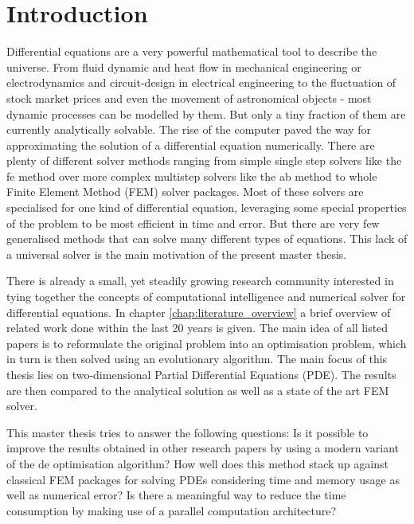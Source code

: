 \documentclass[./\jobname.tex]{subfiles}
\begin{document}
\chapter{Introduction}

Differential equations are a very powerful mathematical tool to describe the universe. From fluid dynamic and heat flow in mechanical engineering or electrodynamics and circuit-design in electrical engineering to the fluctuation of stock market prices and even the movement of astronomical objects - most dynamic processes can be modelled by them. But only a tiny fraction of them are currently analytically solvable. The rise of the computer paved the way for approximating the solution of a differential equation numerically. There are plenty of different solver methods ranging from simple single step solvers like the \gls{fe} method over more complex multistep solvers like the \gls{ab} method to whole Finite Element Method (FEM) solver packages. Most of these solvers are specialised for one kind of differential equation, leveraging some special properties of the problem to be most efficient in time and error. But there are very few generalised methods that can solve many different types of equations. This lack of a universal solver is the main motivation of the present master thesis.

There is already a small, yet steadily growing research community interested in tying together the concepts of computational intelligence and numerical solver for differential equations. In chapter \ref{chap:literature_overview} a brief overview of related work done within the last 20 years is given. The main idea of all listed papers is to reformulate the original problem into an optimisation problem, which in turn is then solved using an evolutionary algorithm. The main focus of this thesis lies on two-dimensional Partial Differential Equations (PDE). The results are then compared to the analytical solution as well as a state of the art FEM solver.  

This master thesis tries to answer the following questions: 
Is it possible to improve the results obtained in other research papers by using a modern variant of the \gls{de} optimisation algorithm? How well does this method stack up against classical FEM packages for solving PDEs considering time and memory usage as well as numerical error? Is there a meaningful way to reduce the time consumption by making use of a parallel computation architecture? 
\end{document}
